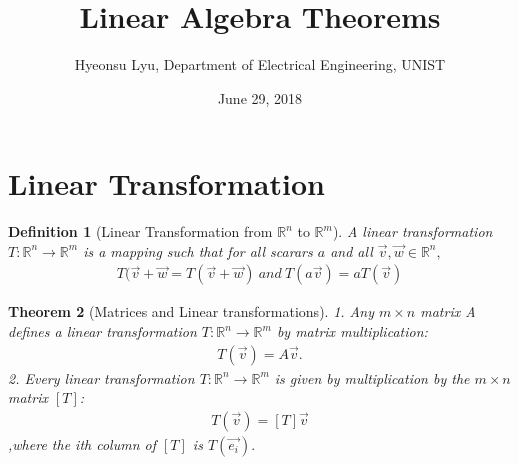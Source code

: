 \documentclass[a4paper,12pt]{article}
\theoremstyle{break}
\newtheorem{theorem}{Theorem}[section]
\newtheorem{definition}[theorem]{Definition}
\begin{document}
\title{Linear Algebra Theorems}
\author{Hyeonsu Lyu, Department of Electrical Engineering, UNIST}
\date{June 29, 2018}
\maketitle

\section{Linear Transformation}
\begin{definition} [Linear Transformation from $\mathbb{R}^n$ to $\mathbb{R}^m$]
    A \textit{linear transformation} $T : \mathbb{R}^n\to\mathbb{R}^m$ is a mapping such that for all scarars $\textit{a}$ and all $\overrightarrow{v}, \overrightarrow{w} \in \mathbb{R}^n,$
\begin{align}
    T(\overrightarrow{v}+\overrightarrow{w}=T(\overrightarrow{v}+\overrightarrow{w})\ and\ T(a\overrightarrow{v})=aT(\overrightarrow{v})
\end{align}
\end{definition}

\begin{theorem} [Matrices and Linear transformations]\label{thm:mlt}
    1. Any $m\times n$ matrix A defines a linear transformation $T:\mathbb{R}^n\to\mathbb{R}^m$ by matrix multiplication:
    \begin{align}
        T(\overrightarrow{v})=A\overrightarrow{v}.
    \end{align}
        2. Every linear transformation $T:\mathbb{R}^n\to\mathbb{R}^m$ is given by multiplication by the $m\times n$ matrix $[T]$:
    \begin{align}
        T(\overrightarrow{v})=[T]\overrightarrow{v}
    \end{align}
        ,where the \textit{i}th column of $[T]$ is $T(\overrightarrow{e_i}).$
\end{theorem}
\end{document}
